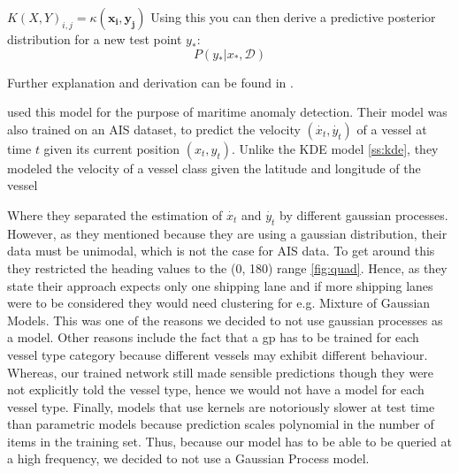 \documentclass[bsc,frontabs,twoside,singlespacing,parskip,deptreport]{infthesis}     %
\begin{document}
\hspace{0.5in} $K(X, Y)_{i, j} = \kappa(\mathbf{x_i}, \mathbf{y_j})$
Using this you can then derive a predictive posterior distribution for a new test point $y_*$:
$$P(y_*| x_*, \mathcal{D})$$

Further explanation and derivation can be found in \cite{rasmussen2003gaussian}.

\citet{kowalska2012maritime} used this model for the purpose of maritime anomaly detection. Their model was also trained on an AIS dataset, to predict the velocity $(\dot{x_t}, \dot{y_t})$ of a vessel at time $t$ given its current position $(x_t, y_t)$. Unlike the KDE model \ref{ss:kde}, they modeled the velocity of a vessel class given the latitude and longitude of the vessel

Where they separated the estimation of $\dot{x_t}$ and $\dot{y_t}$ by different gaussian processes. However, as they mentioned because they are using a gaussian distribution, their data must be unimodal, which is not the case for AIS data. To get around this they restricted the heading values to the (0, 180) range \ref{fig:quad}. Hence, as they state their approach expects only one shipping lane and if more shipping lanes were to be considered they would need clustering for e.g. Mixture of Gaussian Models. This was one of the reasons we decided to not use gaussian processes as a model. Other reasons include the fact that a gp has to be trained for each vessel type category because different vessels may exhibit different behaviour. Whereas, our trained network still made sensible predictions though they were not explicitly told the vessel type, hence we would not have a model for each vessel type. Finally, models that use kernels are notoriously slower at test time than parametric models because prediction scales polynomial in the number of items in the training set. Thus, because our model has to be able to be queried at a high frequency, we decided to not use a Gaussian Process model.
\end{document}
